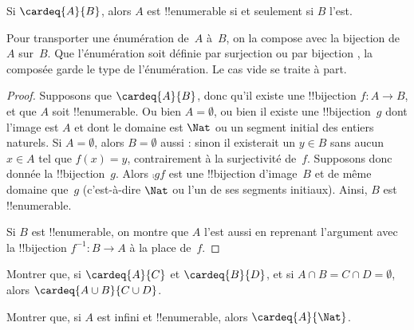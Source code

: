 \documentclass[../../../include/open-logic-section]{subfiles}
\begin{document}
\begin{prop}
Si $\cardeq{A}{B}$, alors $A$ est !!{enumerable} si et seulement si
$B$ l'est.
\end{prop}

\begin{explain}
Pour transporter une énumération de~$A$ à~$B$, on la compose avec la
bijection de~$A$ sur~$B$. Que l'énumération soit définie par surjection
 ou par bijection
,
la composée garde le type de l'énumération. Le cas vide se traite à part.
\end{explain}

\begin{proof}
Supposons que $\cardeq{A}{B}$, donc qu'il existe une !!{bijection}
$f \colon A \to B$, et que $A$ soit !!{enumerable}.
{
  Ou bien $A = \emptyset$, ou bien il existe une !!{bijection}~$g$
  dont l'image est $A$ et dont le domaine est $\Nat$ ou un segment
  initial des entiers naturels. Si $A = \emptyset$, alors
  $B = \emptyset$ aussi : sinon il existerait un $y \in B$ sans
  aucun $x \in A$ tel que $f(x) = y$, contrairement à la
  surjectivité de~$f$.
  Supposons donc donnée la !!{bijection}~$g$. Alors $\comp{g}{f}$
  est une !!{bijection} d'image~$B$ et de même domaine que~$g$
  (c'est-à-dire $\Nat$ ou l'un de ses segments initiaux).
  Ainsi, $B$ est !!{enumerable}.}

Si $B$ est !!{enumerable}, on montre que $A$ l'est aussi en
reprenant l'argument avec la !!{bijection} $f^{-1}\colon B \to A$
à la place de~$f$.
\end{proof}

\begin{prob}
Montrer que, si $\cardeq{A}{C}$ et $\cardeq{B}{D}$, et si
$A \cap B = C \cap D = \emptyset$, alors
$\cardeq{A \cup B}{C \cup D}$.
\end{prob}

\begin{prob}
Montrer que, si $A$ est infini et !!{enumerable}, alors
$\cardeq{A}{\Nat}$.
\end{prob}
\end{document}
